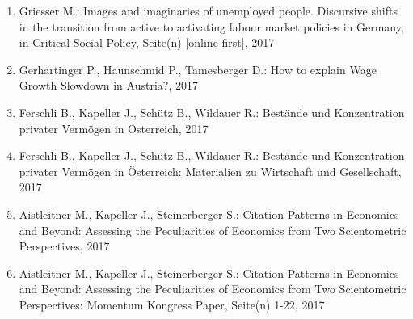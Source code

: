 \begin{enumerate}
	 \item Griesser M.: Images and imaginaries of unemployed people. Discursive shifts in the transition from active to activating labour market policies in Germany, in Critical Social Policy, Seite(n) [online first], 2017
	 \item Gerhartinger P., Haunschmid P., Tamesberger D.: How to explain Wage Growth Slowdown in Austria?, 2017
	 \item Ferschli B., Kapeller J., Schütz B., Wildauer R.: Bestände und Konzentration privater Vermögen in Österreich, 2017
	 \item Ferschli B., Kapeller J., Schütz B., Wildauer R.: Bestände und Konzentration privater Vermögen in Österreich: Materialien zu Wirtschaft und Gesellschaft, 2017
	 \item Aistleitner M., Kapeller J., Steinerberger S.: Citation Patterns in Economics and Beyond: Assessing the Peculiarities of Economics from Two Scientometric Perspectives, 2017
	 \item Aistleitner M., Kapeller J., Steinerberger S.: Citation Patterns in Economics and Beyond: Assessing the Peculiarities of Economics from Two Scientometric Perspectives: Momentum Kongress Paper, Seite(n) 1-22, 2017
\end{enumerate}
